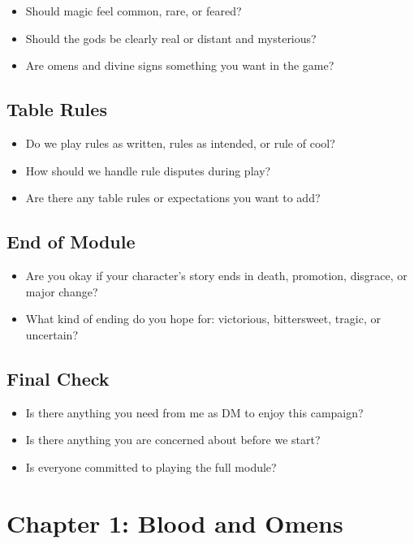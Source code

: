 \documentclass[
]{book}
\providecommand{\tightlist}{%
  \setlength{\itemsep}{0pt}\setlength{\parskip}{0pt}}
\begin{document}
\begin{itemize}
\tightlist
\item
  Should magic feel common, rare, or feared?
\item
  Should the gods be clearly real or distant and mysterious?
\item
  Are omens and divine signs something you want in the game?
\end{itemize}

\section{Table Rules}\label{table-rules}

\begin{itemize}
\tightlist
\item
  Do we play rules as written, rules as intended, or rule of cool?
\item
  How should we handle rule disputes during play?
\item
  Are there any table rules or expectations you want to add?
\end{itemize}

\section{End of Module}\label{end-of-module}

\begin{itemize}
\tightlist
\item
  Are you okay if your character's story ends in death, promotion,
  disgrace, or major change?
\item
  What kind of ending do you hope for: victorious, bittersweet, tragic,
  or uncertain?
\end{itemize}

\section{Final Check}\label{final-check}

\begin{itemize}
\tightlist
\item
  Is there anything you need from me as DM to enjoy this campaign?
\item
  Is there anything you are concerned about before we start?
\item
  Is everyone committed to playing the full module?
\end{itemize}

\chapter{Chapter 1: Blood and Omens}\label{chapter-1-blood-and-omens}
\end{document}
